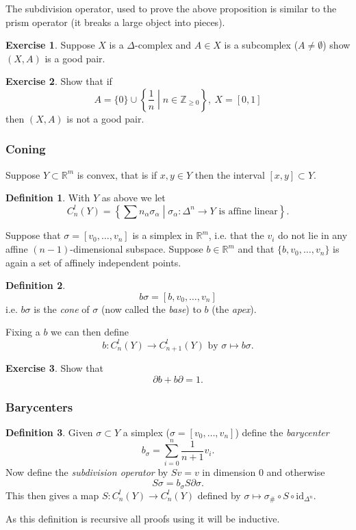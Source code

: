 \documentclass[12pt]{article}
\theoremstyle{definition}
\theoremstyle{definition}
\newtheorem*{defn}{Definition}
\newtheorem*{exer}{Exercise}
\newcommand{\ZZ}{\mathbb{Z}}
\newcommand{\RR}{\mathbb{R}}
\begin{document}
The subdivision operator, used to prove the above proposition is similar to the prism operator (it breaks a large object into pieces).

\begin{exer}
Suppose $X$ is a $\Delta$-complex and $A\in X$ is a subcomplex ($A\ne \emptyset$) show $(X,A)$ is a good pair.
\end{exer}

\begin{exer}
Show that if
\[
A = \{0\} \cup \left\{\frac{1}{n}\middle| n \in \ZZ_{\ge 0} \right\},\ X=[0,1]
\]
then $(X,A)$ is not a good pair.
\end{exer}

\subsubsection{Coning}
Suppose $Y\subset \RR^m$ is convex, that is if $x,y\in Y$ then the interval $[x,y]\subset Y$.

\begin{defn}
With $Y$ as above we let
\[
C_n^l(Y) =\left\{ \sum n_\alpha \sigma_\alpha \middle| \sigma_\alpha \colon \Delta^n \to Y \text{ is affine linear}\right\}.
\]
\end{defn}

Suppose that $\sigma = [v_0,\ldots,v_n]$ is a simplex in $\RR^m$, i.e. that the $v_i$ do not lie in any affine $(n-1)$-dimensional subspace.
Suppose $b\in \RR^m$ and that $\{b,v_0,\ldots,v_n\}$ is again a set of affinely independent points.

\begin{defn}
\[
b\sigma = [b,v_0,\ldots,v_n]
\]
i.e. $b\sigma$ is the \emph{cone} of $\sigma$ (now called the \emph{base}) to $b$ (the \emph{apex}).

Fixing a $b$ we can then define
\[
b\colon C_n^l (Y) \to C_{n+1}^l(Y)
\text{ by }
\sigma \mapsto b\sigma.
\]
\end{defn}

\begin{exer}
Show that
\[
\partial b + b\partial = 1.
\]
\end{exer}

\subsubsection{Barycenters}
\begin{defn}
Given $\sigma \subset Y$ a simplex ($\sigma = [v_0,\ldots,v_n]$) define the \emph{barycenter}
\[
b_\sigma = \sum_{i=0}^{n} \frac{1}{n+1}v_i.
\]
Now define the \emph{subdivision operator} by $Sv = v$ in dimension 0 and otherwise
\[
S\sigma = b_\sigma S\partial \sigma.
\]
This then gives a map $S\colon C_n^l(Y) \to C_n^l(Y)$ defined by $\sigma \mapsto \sigma_\#\circ S\circ \text{id}_{\Delta^n}$.
\end{defn}
As this definition is recursive all proofs using it will be inductive.
\end{document}
